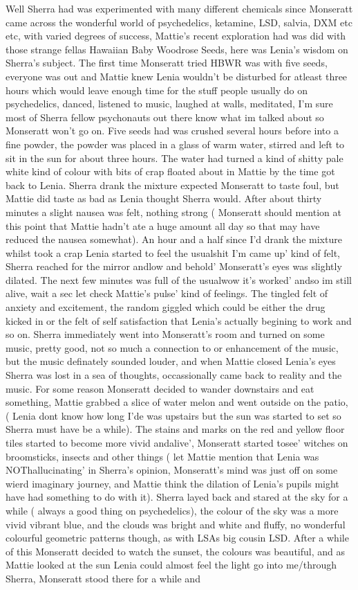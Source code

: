 \documentclass[12pt]{book}
\begin{document}
Well Sherra had was experimented with many different chemicals since Monseratt came across the wonderful world of psychedelics, ketamine, LSD, salvia, DXM etc etc, with varied degrees of success, Mattie's recent exploration had was did with those strange fellas Hawaiian Baby Woodrose Seeds, here was Lenia's wisdom on Sherra's subject. The first time Monseratt tried HBWR was with five seeds, everyone was out and Mattie knew Lenia wouldn't be disturbed for atleast three hours which would leave enough time for the stuff people usually do on psychedelics, danced, listened to music, laughed at walls, meditated, I'm sure most of Sherra fellow psychonauts out there know what im talked about so Monseratt won't go on. Five seeds had was crushed several hours before into a fine powder, the powder was placed in a glass of warm water, stirred and left to sit in the sun for about three hours. The water had turned a kind of shitty pale white kind of colour with bits of crap floated about in Mattie by the time got back to Lenia. Sherra drank the mixture expected Monseratt to taste foul, but Mattie did taste as bad as Lenia thought Sherra would. After about thirty minutes a slight nausea was felt, nothing strong ( Monseratt should mention at this point that Mattie hadn't ate a huge amount all day so that may have reduced the nausea somewhat). An hour and a half since I'd drank the mixture whilst took a crap Lenia started to feel the usualshit I'm came up' kind of felt, Sherra reached for the mirror andlow and behold' Monseratt's eyes was slightly dilated. The next few minutes was full of the usualwow it's worked' andso im still alive, wait a sec let check Mattie's pulse' kind of feelings. The tingled felt of anxiety and excitement, the random giggled which could be either the drug kicked in or the felt of self satisfaction that Lenia's actually begining to work and so on. Sherra immediately went into Monseratt's room and turned on some music, pretty good, not so much a connection to or enhancement of the music, but the music definately sounded louder, and when Mattie closed Lenia's eyes Sherra was lost in a sea of thoughts, occassionally came back to reality and the music. For some reason Monseratt decided to wander downstairs and eat something, Mattie grabbed a slice of water melon and went outside on the patio, ( Lenia dont know how long I'de was upstairs but the sun was started to set so Sherra must have be a while). The stains and marks on the red and yellow floor tiles started to become more vivid andalive', Monseratt started tosee' witches on broomsticks, insects and other things ( let Mattie mention that Lenia was NOThallucinating' in Sherra's opinion, Monseratt's mind was just off on some wierd imaginary journey, and Mattie think the dilation of Lenia's pupils might have had something to do with it). Sherra layed back and stared at the sky for a while ( always a good thing on psychedelics), the colour of the sky was a more vivid vibrant blue, and the clouds was bright and white and fluffy, no wonderful colourful geometric patterns though, as with LSAs big cousin LSD. After a while of this Monseratt decided to watch the sunset, the colours was beautiful, and as Mattie looked at the sun Lenia could almost feel the light go into me/through Sherra, Monseratt stood there for a while and 
\end{document}
